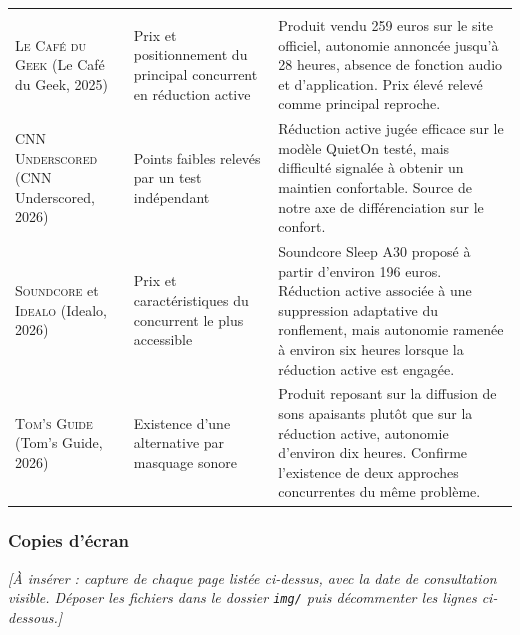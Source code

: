 \begin{center}
\begin{xltabular}{\textwidth}{P{3.4cm}P{3.6cm}L}
\toprule
{} &  &  \\
\midrule
\endfirsthead
\toprule
{} &  &  \\
\midrule
\endhead

\textsc{Le Café du Geek} (Le Café du Geek, 2025)
&
Prix et positionnement du principal concurrent en réduction active
&
Produit vendu 259 euros sur le site officiel, autonomie annoncée jusqu'à 28
heures, absence de fonction audio et d'application. Prix élevé relevé comme
principal reproche. \\

\textsc{CNN Underscored} (CNN Underscored, 2026)
&
Points faibles relevés par un test indépendant
&
Réduction active jugée efficace sur le modèle QuietOn testé, mais difficulté
signalée à obtenir un maintien confortable. Source de notre axe de
différenciation sur le confort. \\

\textsc{Soundcore} et \textsc{Idealo} (Idealo, 2026)
&
Prix et caractéristiques du concurrent le plus accessible
&
Soundcore Sleep A30 proposé à partir d'environ 196 euros. Réduction active
associée à une suppression adaptative du ronflement, mais autonomie ramenée à
environ six heures lorsque la réduction active est engagée. \\

\textsc{Tom's Guide} (Tom's Guide, 2026)
&
Existence d'une alternative par masquage sonore
&
Produit reposant sur la diffusion de sons apaisants plutôt que sur la réduction
active, autonomie d'environ dix heures. Confirme l'existence de deux approches
concurrentes du même problème. \\
\bottomrule
\end{xltabular}
\end{center}

\subsubsection{Copies d'écran}

\textit{[À insérer : capture de chaque page listée ci-dessus, avec la date de
consultation visible. Déposer les fichiers dans le dossier \texttt{img/} puis
décommenter les lignes ci-dessous.]}


